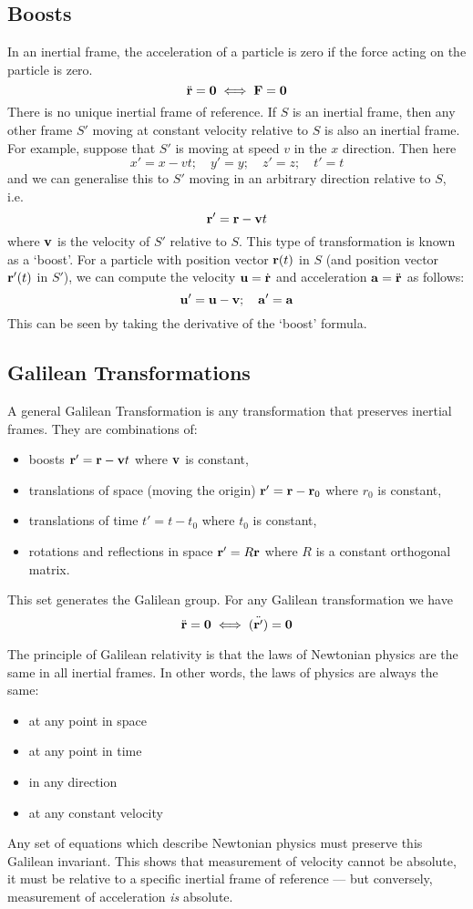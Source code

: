 \subsection{Boosts}
In an inertial frame, the acceleration of a particle is zero if the force acting on the particle is zero.
\[
	\ddot{\vb r} = \vb 0 \iff \vb F = \vb 0
\]
There is no unique inertial frame of reference.
If \(S\) is an inertial frame, then any other frame \(S'\) moving at constant velocity relative to \(S\) is also an inertial frame.
For example, suppose that \(S'\) is moving at speed \(v\) in the \(x\) direction.
Then here
\[
	x'=x-vt;\quad y'=y;\quad z'=z;\quad t'=t
\]
and we can generalise this to \(S'\) moving in an arbitrary direction relative to \(S\), i.e.
\[
	\vb r' = \vb r - \vb v t
\]
where \(\vb v\) is the velocity of \(S'\) relative to \(S\).
This type of transformation is known as a `boost'.
For a particle with position vector \(\vb r(t)\) in \(S\) (and position vector \(\vb r'(t)\) in \(S'\)), we can compute the velocity \(\vb u = \dot{\vb r}\) and acceleration \(\vb a = \ddot{\vb r}\) as follows:
\[
	\vb u' = \vb u - \vb v;\quad \vb a' = \vb a
\]
This can be seen by taking the derivative of the `boost' formula.

\subsection{Galilean Transformations}
A general Galilean Transformation is any transformation that preserves inertial frames.
They are combinations of:
\begin{itemize}
	\item boosts \(\vb r' = \vb r - \vb vt\) where \(\vb v\) is constant,
	\item translations of space (moving the origin) \(\vb r' = \vb r - \vb r_0\) where \(r_0\) is constant,
	\item translations of time \(t' = t - t_0\) where \(t_0\) is constant,
	\item rotations and reflections in space \(\vb r' = R \vb r\) where \(R\) is a constant orthogonal matrix.
\end{itemize}
This set generates the Galilean group.
For any Galilean transformation we have
\[
	\ddot{\vb r} = \vb 0 \iff \ddot{(\vb r')} = \vb 0
\]

The principle of Galilean relativity is that the laws of Newtonian physics are the same in all inertial frames.
In other words, the laws of physics are always the same:
\begin{itemize}
	\item at any point in space
	\item at any point in time
	\item in any direction
	\item at any constant velocity
\end{itemize}
Any set of equations which describe Newtonian physics must preserve this Galilean invariant.
This shows that measurement of velocity cannot be absolute, it must be relative to a specific inertial frame of reference --- but conversely, measurement of acceleration \textit{is} absolute.

